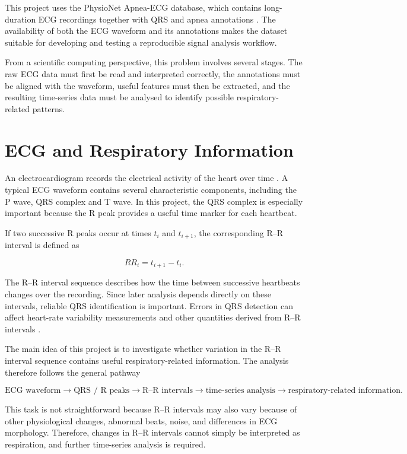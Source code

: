 \documentclass[a4paper,10.5pt,oneside]{report}
\begin{document}
This project uses the PhysioNet Apnea-ECG database, which contains
long-duration ECG recordings together with QRS and apnea annotations
\cite{penzel2000}. The availability of both the ECG waveform and its annotations
makes the dataset suitable for developing and testing a reproducible signal
analysis workflow.

From a scientific computing perspective, this problem involves several stages.
The raw ECG data must first be read and interpreted correctly, the annotations
must be aligned with the waveform, useful features must then be extracted, and
the resulting time-series data must be analysed to identify possible
respiratory-related patterns.

\section{ECG and Respiratory Information}

An electrocardiogram records the electrical activity of the heart over time
\cite{ecgsource}. A typical ECG waveform contains several characteristic
components, including the P wave, QRS complex and T wave. In this project, the
QRS complex is especially important because the R peak provides a useful time
marker for each heartbeat.

If two successive R peaks occur at times $t_i$ and $t_{i+1}$, the corresponding
R--R interval is defined as

\begin{equation}
RR_i = t_{i+1} - t_i .
\end{equation}

The R--R interval sequence describes how the time between successive heartbeats
changes over the recording. Since later analysis depends directly on these
intervals, reliable QRS identification is important. Errors in QRS detection
can affect heart-rate variability measurements and other quantities derived
from R--R intervals \cite{weinstein2026}.

The main idea of this project is to investigate whether variation in the
R--R interval sequence contains useful respiratory-related information. The
analysis therefore follows the general pathway

\[
\text{ECG waveform}
\rightarrow
\text{QRS / R peaks}
\rightarrow
\text{R--R intervals}
\rightarrow
\text{time-series analysis}
\rightarrow
\text{respiratory-related information}.
\]

This task is not straightforward because R--R intervals may also vary because
of other physiological changes, abnormal beats, noise, and differences in ECG
morphology. Therefore, changes in R--R intervals cannot simply be interpreted
as respiration, and further time-series analysis is required.
\end{document}
